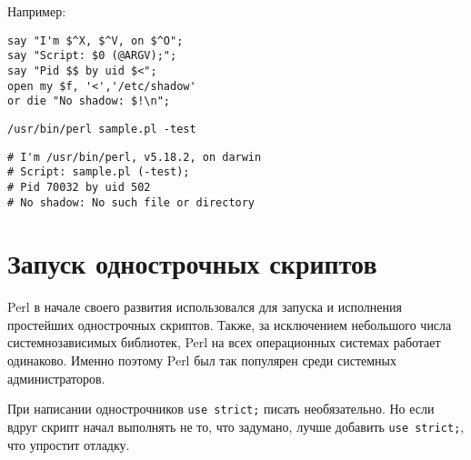 Например:
\begin{verbatim}
say "I'm $^X, $^V, on $^O";
say "Script: $0 (@ARGV);";
say "Pid $$ by uid $<";
open my $f, '<','/etc/shadow'
or die "No shadow: $!\n";
\end{verbatim}

\begin{verbatim}
/usr/bin/perl sample.pl -test
\end{verbatim}

\begin{verbatim}
# I'm /usr/bin/perl, v5.18.2, on darwin
# Script: sample.pl (-test);
# Pid 70032 by uid 502
# No shadow: No such file or directory
\end{verbatim}

\section{Запуск однострочных скриптов}
Perl в начале своего развития использовался для запуска и исполнения простейших однострочных скриптов. Также, за исключением небольшого числа системнозависимых библиотек, Perl на всех операционных системах работает одинаково. Именно поэтому Perl был так популярен среди системных администраторов.

При написании однострочников \verb|use strict;| писать необязательно. Но если вдруг скрипт начал выполнять не то, что задумано, лучше добавить \verb|use strict;|, что упростит отладку.

